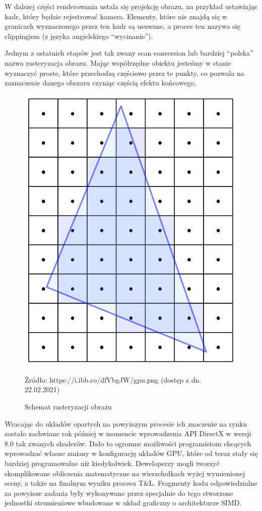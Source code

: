 \documentclass{article}
\begin{document}
	\par
	W dalszej części renderowania ustala się projekcję obrazu, na przykład ustawiając kadr, który będzie rejestrować kamera. Elementy, które nie znajdą się w granicach wyznaczonego przez ten kadr są usuwane, a proces ten nazywa się clippingiem (z języka angielskiego “wycinanie”).
	\par
	Jednym z ostatnich etapów jest tak zwany scan conversion lub bardziej “polska” nazwa rasteryzacja obrazu. Mając współrzędne obiektu jesteśmy w stanie wyznaczyć proste, które przechodzą częściowo przez te punkty, co pozwala na zaznaczenie danego obszaru czyniąc częścią efektu końcowego.
	\begin{figure}
		\centering
		\includegraphics[width=15cm]{polygon}
		\caption{Schemat rasteryzacji obrazu}
		Źródło: https://i.ibb.co/dfVbgJW/gpu.png (dostęp z dn. 22.02.2021)
	\end{figure}
	\par
	Wracając do układów opartych na powyższym procesie ich znaczenie na rynku \linebreak zostało zachwiane rok później w momencie wprowadzenia API DirectX w wersji 8.0 tak zwanych shaderów. Dało to ogromne możliwości programistom chcących wprowadzać własne zmiany w konfigurację układów GPU, które od teraz stały się bardziej programowalne niż kiedykolwiek. Deweloperzy mogli tworzyć skomplikowane obliczenia matematyczne na wierzchołkach wyżej wymienionej sceny, a także na finalnym wyniku procesu T\&L. Fragmenty kodu odpowiedzialne za powyższe zadania były wykonywane przez specjalnie do tego stworzone jednostki strumieniowe wbudowane w układ graficzny o architekturze SIMD.
\end{document}
